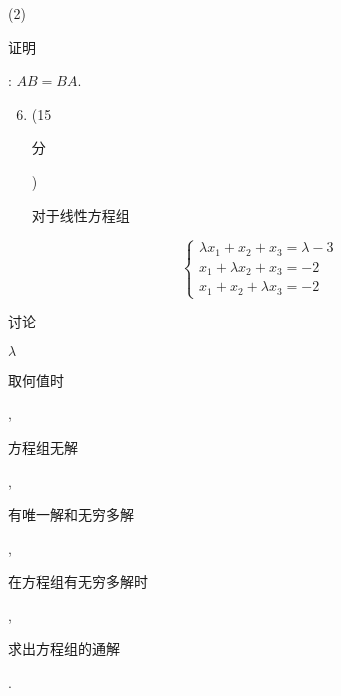 \documentclass[10pt]{article}
\begin{document}
(2) \begin{CJK}{UTF8}{mj}证明\end{CJK}: $A B=B A$.

\begin{enumerate}
  \setcounter{enumi}{5}
  \item (15 \begin{CJK}{UTF8}{mj}分\end{CJK}) \begin{CJK}{UTF8}{mj}对于线性方程组\end{CJK}
\end{enumerate}
$$
\left\{\begin{array}{l}
\lambda x_{1}+x_{2}+x_{3}=\lambda-3 \\
x_{1}+\lambda x_{2}+x_{3}=-2 \\
x_{1}+x_{2}+\lambda x_{3}=-2
\end{array}\right.
$$
\begin{CJK}{UTF8}{mj}讨论\end{CJK} $\lambda$ \begin{CJK}{UTF8}{mj}取何值时\end{CJK}, \begin{CJK}{UTF8}{mj}方程组无解\end{CJK}, \begin{CJK}{UTF8}{mj}有唯一解和无穷多解\end{CJK}, \begin{CJK}{UTF8}{mj}在方程组有无穷多解时\end{CJK}, \begin{CJK}{UTF8}{mj}求出方程组的通解\end{CJK}.
\end{document}

